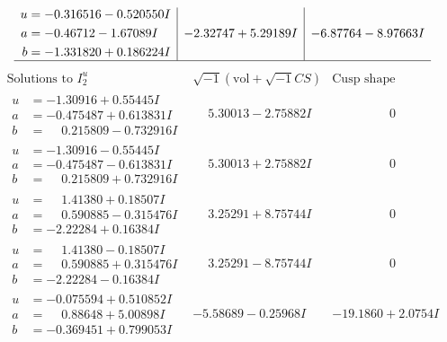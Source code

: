 \documentclass[1p]{elsarticle_modified}
\theoremstyle{definition}
\newcommand{\I}{\sqrt{-1}}
\begin{document}
$$\begin{array}{c|c|c}
\begin{aligned}
u &= -0.316516 - 0.520550 I \\
a &= -0.46712 - 1.67089 I \\
b &= -1.331820 + 0.186224 I\end{aligned}
 & -2.32747 + 5.29189 I & -6.87764 - 8.97663 I\\
 \hline 
 \end{array}$$\newpage$$\begin{array}{c|c|c}  
\text{Solutions to }I^u_{2}& \I (\text{vol} + \sqrt{-1}CS) & \text{Cusp shape}\\
 \hline 
\begin{aligned}
u &= -1.30916 + 0.55445 I \\
a &= -0.475487 + 0.613831 I \\
b &= \phantom{-}0.215809 - 0.732916 I\end{aligned}
 & \phantom{-}5.30013 - 2.75882 I & \phantom{-0.000000 } 0 \\ \hline\begin{aligned}
u &= -1.30916 - 0.55445 I \\
a &= -0.475487 - 0.613831 I \\
b &= \phantom{-}0.215809 + 0.732916 I\end{aligned}
 & \phantom{-}5.30013 + 2.75882 I & \phantom{-0.000000 } 0 \\ \hline\begin{aligned}
u &= \phantom{-}1.41380 + 0.18507 I \\
a &= \phantom{-}0.590885 - 0.315476 I \\
b &= -2.22284 + 0.16384 I\end{aligned}
 & \phantom{-}3.25291 + 8.75744 I & \phantom{-0.000000 } 0 \\ \hline\begin{aligned}
u &= \phantom{-}1.41380 - 0.18507 I \\
a &= \phantom{-}0.590885 + 0.315476 I \\
b &= -2.22284 - 0.16384 I\end{aligned}
 & \phantom{-}3.25291 - 8.75744 I & \phantom{-0.000000 } 0 \\ \hline\begin{aligned}
u &= -0.075594 + 0.510852 I \\
a &= \phantom{-}0.88648 + 5.00898 I \\
b &= -0.369451 + 0.799053 I\end{aligned}
 & -5.58689 - 0.25968 I & -19.1860 + 2.0754 I \\ \hline\begin{aligned}

\end{aligned}
\end{array}$$
\end{document}

